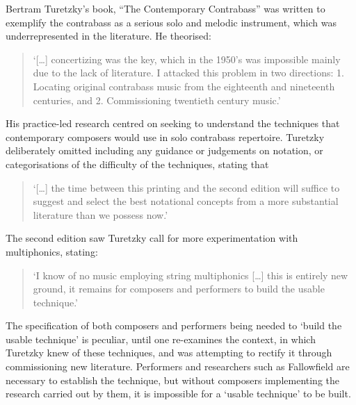 Bertram Turetzky’s book, “The Contemporary Contrabass” was written to exemplify the contrabass as a serious solo and melodic instrument, which was underrepresented in the literature. He theorised: 
\begin{quote}
    ‘[…] concertizing was the key, which in the 1950’s was impossible mainly due to the lack of literature. I attacked this problem in two directions: 1. Locating original contrabass music from the eighteenth and nineteenth centuries, and 2. Commissioning twentieth century music.’\autocite[vii]{turetzkyContemporaryContrabass1974}
\end{quote}
His practice-led research centred on seeking to understand the techniques that contemporary composers would use in solo contrabass repertoire. Turetzky deliberately omitted including any guidance or judgements on notation, or categorisations of the difficulty of the techniques, stating that \begin{quote}
    ‘[…] the time between this printing and the second edition will suffice to suggest and select the best notational concepts from a more substantial literature than we possess now.’\autocite{turetzkyContemporaryContrabass1974} 
\end{quote}The second edition saw Turetzky call for more experimentation with multiphonics, stating:
\begin{quote}
    ‘I know of no music employing string multiphonics […] this is entirely new ground, it remains for composers and performers to build the usable technique.’\autocite[138]{turetzkyContemporaryContrabass1992}
\end{quote}
The specification of both composers and performers being needed to ‘build the usable technique’ is peculiar, until one re-examines the context, in which Turetzky knew of these techniques, and was attempting to rectify it through commissioning new literature. Performers and researchers such as Fallowfield are necessary to establish the technique, but without composers implementing the research carried out by them, it is impossible for a ‘usable technique’ to be built.

